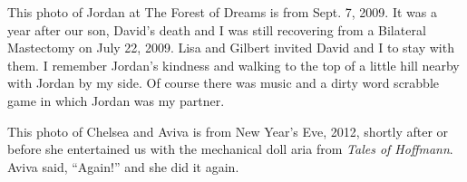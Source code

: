 \begin{window}
\smallskip
This photo of Jordan at The Forest of Dreams is from Sept. 7, 2009. It was
a year after our son, David's death and I was still recovering from
a Bilateral Mastectomy on July 22, 2009. Lisa and Gilbert invited David and
I to stay with them. I remember Jordan's kindness and walking to the top of
a little hill nearby with Jordan by my side. Of course there was music and
a dirty word scrabble game in which Jordan was my partner.
\end{window}

\begin{window}
\smallskip
This photo of Chelsea and Aviva is from New Year's Eve, 2012, shortly after or
before she entertained us with the mechanical doll aria from {\it Tales of
Hoffmann}. Aviva said, ``Again!'' and she did it again.
\end{window}


